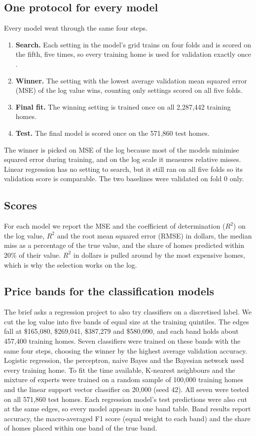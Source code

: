 \documentclass[sigconf,nonacm,10pt]{acmart}
\begin{document}
\subsection{One protocol for every model}
Every model went through the same four steps.
\begin{enumerate}
\item \textbf{Search.} Each setting in the model's grid trains on four folds and is scored on the fifth, five times, so every training home is used for validation exactly once \cite{kohavi1995}.
\item \textbf{Winner.} The setting with the lowest average validation mean squared error (MSE) of the log value wins, counting only settings scored on all five folds.
\item \textbf{Final fit.} The winning setting is trained once on all 2,287,442 training homes.
\item \textbf{Test.} The final model is scored once on the 571,860 test homes.
\end{enumerate}
The winner is picked on MSE of the log because most of the models minimise squared error during training, and on the log scale it measures relative misses. Linear regression has no setting to search, but it still ran on all five folds so its validation score is comparable. The two baselines were validated on fold 0 only.

\subsection{Scores}
For each model we report the MSE and the coefficient of determination ($R^2$) on the log value, $R^2$ and the root mean squared error (RMSE) in dollars, the median miss as a percentage of the true value, and the share of homes predicted within 20\% of their value. $R^2$ in dollars is pulled around by the most expensive homes, which is why the selection works on the log.

\subsection{Price bands for the classification models}
The brief asks a regression project to also try classifiers on a discretised label. We cut the log value into five bands of equal size at the training quintiles. The edges fall at \$165,080, \$269,041, \$387,279 and \$580,090, and each band holds about 457,400 training homes. Seven classifiers were trained on these bands with the same four steps, choosing the winner by the highest average validation accuracy. Logistic regression, the perceptron, naive Bayes and the Bayesian network used every training home. To fit the time available, K-nearest neighbours and the mixture of experts were trained on a random sample of 100,000 training homes and the linear support vector classifier on 20,000 (seed 42). All seven were tested on all 571,860 test homes. Each regression model's test predictions were also cut at the same edges, so every model appears in one band table. Band results report accuracy, the macro-averaged F1 score (equal weight to each band) and the share of homes placed within one band of the true band.
\end{document}
